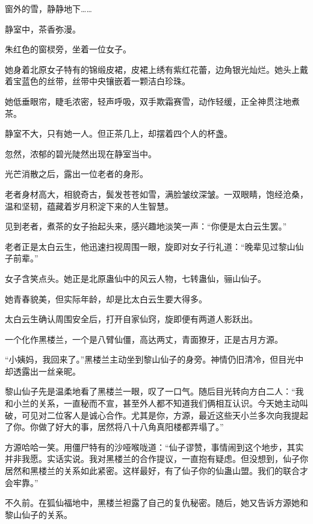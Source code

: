 
\begin{this_body}



窗外的雪，静静地下……

静室中，茶香弥漫。

朱红色的窗棂旁，坐着一位女子。

她身着北原女子特有的锦缎皮裙，皮裙上绣有紫红花蕾，边角银光灿烂。她头上戴着宝蓝色的丝带，丝带中央镶嵌着一颗洁白珍珠。

她低垂眼帘，睫毛浓密，轻声呼吸，双手欺霜赛雪，动作轻缓，正全神贯注地煮茶。

静室不大，只有她一人。但正茶几上，却摆着四个人的杯盏。

忽然，浓郁的碧光陡然出现在静室当中。

光芒消散之后，露出一位老者的身形。

老者身材高大，相貌奇古，鬓发苍苍如雪，满脸皱纹深皱。一双眼睛，饱经沧桑，温和坚韧，蕴藏着岁月积淀下来的人生智慧。

见到老者，煮茶的女子抬起头来，感兴趣地淡笑一声：“你便是太白云生罢。”

老者正是太白云生，他迅速扫视周围一眼，旋即对女子行礼道：“晚辈见过黎山仙子前辈。”

女子含笑点头。她正是北原蛊仙中的风云人物，七转蛊仙，骊山仙子。

她青春貌美，但实际年龄，却是比太白云生要大得多。

太白云生确认周围安全后，打开自家仙窍，旋即便有两道人影跃出。

一个化作黑楼兰，一个是八臂仙僵，高达两丈，青面獠牙，正是古月方源。

“小姨妈，我回来了。”黑楼兰主动坐到黎山仙子的身旁。神情仍旧清冷，但目光中却透露出一丝亲昵。

黎山仙子先是温柔地看了黑楼兰一眼，叹了一口气。随后目光转向方白二人：“我和小兰的关系，一直秘而不宣，甚至外人都不知道我们俩相互认识。今天她主动叫破，可见对二位客人是诚心合作。尤其是你，方源，最近这些天小兰多次向我提起了你。你做了好大的事，居然将八十八角真阳楼都弄塌了。”

方源哈哈一笑。用僵尸特有的沙哑喉咙道：“仙子谬赞，事情闹到这个地步，其实并非我愿。实话实说。我对黑楼兰的合作提议，一直抱有疑虑。但没想到，仙子你居然和黑楼兰的关系如此紧密。这样最好，有了仙子你的仙蛊山盟。我们的联合才会牢靠。”

不久前。在狐仙福地中，黑楼兰袒露了自己的复仇秘密。随后，她又告诉方源她和黎山仙子的关系。


\end{this_body}

